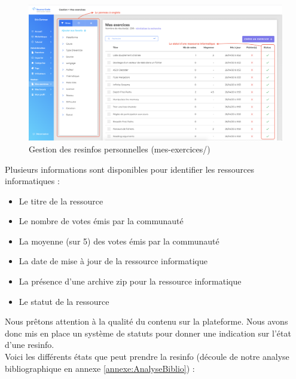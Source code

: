 \begin{figure}[H]
    \includegraphics[width=\textwidth,height=\textheight,keepaspectratio]{images/client/gestion-exercices.png}
    \centering
    \caption[SourceCode : gestion des \glspl{resinfo} personnelles]{Gestion des \glspl{resinfo} personnelles (mes-exercices/)}
\end{figure}

Plusieurs informations sont disponibles pour identifier les ressources informatiques :

\begin{itemize}
    \item Le titre de la ressource
    \item Le nombre de votes émis par la communauté
    \item La moyenne (sur 5) des votes émis par la communauté
    \item La date de mise à jour de la ressource informatique
    \item La présence d'une archive zip pour la ressource informatique
    \item Le statut de la ressource
\end{itemize}


\label{section:statutDuneRessource}

Nous prêtons attention à la qualité du contenu sur la plateforme. Nous avons donc mis en place un système de statuts pour donner une indication sur l'état d'une \gls{resinfo}.\\

Voici les différents états que peut prendre la \gls{resinfo} (découle de notre analyse bibliographique en annexe \ref{annexe:AnalyseBiblio}) :

